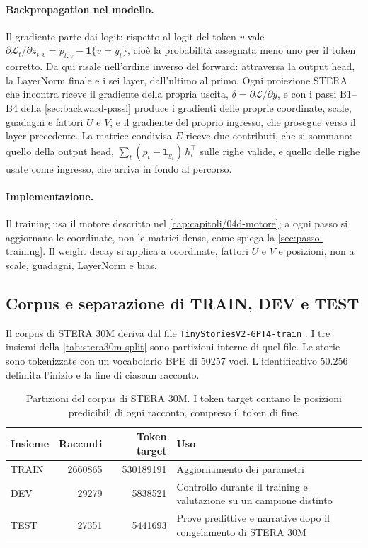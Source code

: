 \paragraph{Backpropagation nel modello.} Il gradiente parte dai logit: rispetto al logit del token $v$ vale $\partial\mathcal L_t/\partial z_{t,v}=p_{t,v}-\mathbf 1\{v=y_t\}$, cioè la probabilità assegnata meno uno per il token corretto. Da qui risale nell'ordine inverso del forward: attraversa la output head, la LayerNorm finale e i sei layer, dall'ultimo al primo. Ogni proiezione STERA che incontra riceve il gradiente della propria uscita, $\delta=\partial\mathcal L/\partial y$, e con i passi B1--B4 della \autoref{sec:backward-passi} produce i gradienti delle proprie coordinate, scale, guadagni e fattori $U$ e $V$, e il gradiente del proprio ingresso, che prosegue verso il layer precedente. La matrice condivisa $E$ riceve due contributi, che si sommano: quello della output head, $\sum_t(p_t-\mathbf 1_{y_t})\,h_t^\top$ sulle righe valide, e quello delle righe usate come ingresso, che arriva in fondo al percorso.

\paragraph{Implementazione.} Il training usa il motore descritto nel \autoref{cap:capitoli/04d-motore}; a ogni passo si aggiornano le coordinate, non le matrici dense, come spiega la \autoref{sec:passo-training}. Il weight decay si applica a coordinate, fattori $U$ e $V$ e posizioni, non a scale, guadagni, LayerNorm e bias.

\subsection{Corpus e separazione di TRAIN, DEV e TEST}\label{sec:stera30m-dati}

Il corpus di STERA 30M deriva dal file \texttt{TinyStoriesV2-GPT4-train} \cite{eldan2023tinystories}. I tre insiemi della \autoref{tab:stera30m-split} sono partizioni interne di quel file. Le storie sono tokenizzate con un vocabolario BPE di \num{50257} voci. L'identificativo 50.256 delimita l'inizio e la fine di ciascun racconto.

\begin{table}[H]
\centering
\small
\begin{tabularx}{\linewidth}{lrrX}
\toprule
Insieme & Racconti & Token target & Uso \\
\midrule
TRAIN & \num{2660865} & \num{530189191} & Aggiornamento dei parametri \\
DEV & \num{29279} & \num{5838521} & Controllo durante il training e valutazione su un campione distinto \\
TEST & \num{27351} & \num{5441693} & Prove predittive e narrative dopo il congelamento di STERA 30M \\
\bottomrule
\end{tabularx}
\caption{Partizioni del corpus di STERA 30M. I token target contano le posizioni predicibili di ogni racconto, compreso il token di fine.}
\label{tab:stera30m-split}
\end{table}

